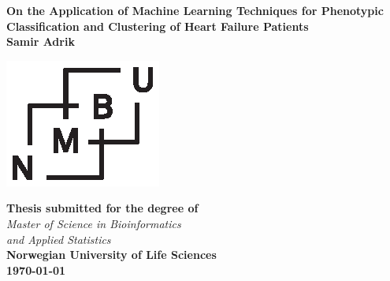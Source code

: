 \documentclass[../thesis.tex]{subfiles}
\begin{document}
\begin{titlepage}
\begin{center}
\vspace*{0,25cm}\Large{\textbf{On the Application of Machine Learning Techniques for Phenotypic Classification and Clustering of Heart Failure Patients}}\\[0,4cm]

\vspace*{1,5cm}\large{\textbf{Samir Adrik}}

\vspace*{3cm}\includegraphics[scale=1.5]{../images/NMBU.eps}

\vspace{1cm}\normalsize{\textbf{Thesis submitted for the degree of}\\[0,1cm] \textit{Master of Science in Bioinformatics\\ and Applied Statistics}}\\[0,5cm]

\normalsize{\textbf{Norwegian University of Life Sciences}}\\[0,5cm]

\normalsize{\textbf{\today}}
\end{center}
\end{titlepage}

\newpage{\pagestyle{empty}\cleardoublepage}
\end{document}
